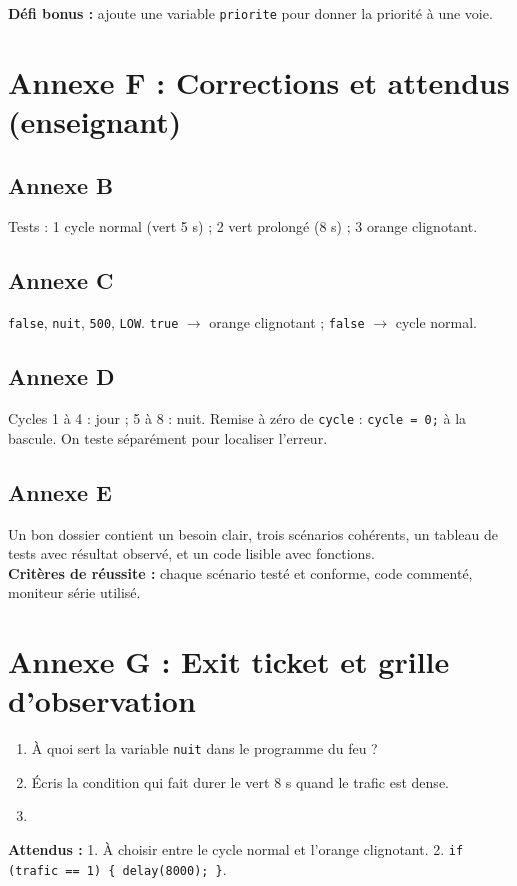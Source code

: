 \documentclass[11pt,a4paper]{article}
\begin{document}
\textbf{Défi bonus :} ajoute une variable \texttt{priorite} pour donner la priorité à une voie.

\newpage
\section*{Annexe F : Corrections et attendus (enseignant)}

\subsection*{Annexe B}
Tests : 1 cycle normal (vert 5 s) ; 2 vert prolongé (8 s) ; 3 orange clignotant.

\subsection*{Annexe C}
\texttt{false}, \texttt{nuit}, \texttt{500}, \texttt{LOW}. \texttt{true} $\rightarrow$ orange clignotant ; \texttt{false} $\rightarrow$ cycle normal.

\subsection*{Annexe D}
Cycles 1 à 4 : jour ; 5 à 8 : nuit. Remise à zéro de \texttt{cycle} : \texttt{cycle = 0;} à la bascule. On teste séparément pour localiser l'erreur.

\subsection*{Annexe E}
Un bon dossier contient un besoin clair, trois scénarios cohérents, un tableau de tests avec résultat observé, et un code lisible avec fonctions.\\
\textbf{Critères de réussite :} chaque scénario testé et conforme, code commenté, moniteur série utilisé.

\newpage
\section*{Annexe G : Exit ticket et grille d'observation}

\begin{enumerate}
 \item À quoi sert la variable \texttt{nuit} dans le programme du feu ?\\ \lig
 \item Écris la condition qui fait durer le vert 8 s quand le trafic est dense.\\ \lig
 \item \autoeval
\end{enumerate}
\textbf{Attendus :} 1. À choisir entre le cycle normal et l'orange clignotant. 2. \texttt{if (trafic == 1) \{ delay(8000); \}}.

\bigskip
{}
\end{document}
